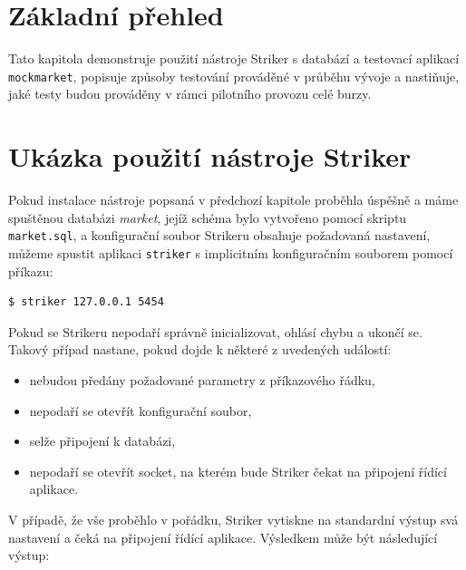 \documentclass[thesis=M,czech]{FITthesis}[2012/06/26]
\begin{document}
\section{Základní přehled}

Tato kapitola demonstruje použití nástroje Striker s databází a testovací aplikací \texttt{mockmarket}, popisuje způsoby 
testování prováděné v průběhu vývoje a nastiňuje, jaké testy budou prováděny v rámci pilotního provozu celé burzy. 


\section{Ukázka použití nástroje Striker}

Pokud instalace nástroje popsaná v předchozí kapitole proběhla úspěšně a máme spuštěnou databázi \textit{market}, 
jejíž schéma bylo vytvořeno pomocí skriptu \texttt{market.sql}, a konfigurační soubor Strikeru obsahuje požadovaná 
nastavení, můžeme spustit aplikaci \texttt{striker} s implicitním konfiguračním souborem pomocí příkazu:

\begin{lstlisting}[basicstyle={\small\ttfamily}] 
   $ striker 127.0.0.1 5454
\end{lstlisting}

Pokud se Strikeru nepodaří správně inicializovat, ohlásí chybu a ukončí se. Takový případ nastane, pokud dojde k některé 
z uvedených událostí:

\begin{itemize}
	\item nebudou předány požadované parametry z příkazového řádku,
	\item nepodaří se otevřít konfigurační soubor,
	\item selže připojení k databázi, 
	\item nepodaří se otevřít socket, na kterém bude Striker čekat na připojení řídící aplikace.
\end{itemize}

V případě, že vše proběhlo v pořádku, Striker vytiskne na standardní výstup svá nastavení a čeká na připojení řídící aplikace. 
Výsledkem může být následující výstup:
\end{document}
